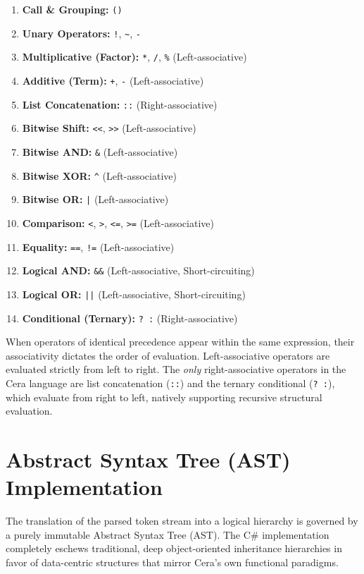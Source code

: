 \documentclass[11pt, a4paper]{article}
\begin{document}
\begin{enumerate}
    \item \textbf{Call \& Grouping:} \texttt{()} 
    \item \textbf{Unary Operators:} \texttt{!}, \texttt{\~{}}, \texttt{-}
    \item \textbf{Multiplicative (Factor):} \texttt{*}, \texttt{/}, \texttt{\%} (Left-associative)
    \item \textbf{Additive (Term):} \texttt{+}, \texttt{-} (Left-associative)
    \item \textbf{List Concatenation:} \texttt{::} (Right-associative)
    \item \textbf{Bitwise Shift:} \texttt{<<}, \texttt{>>} (Left-associative)
    \item \textbf{Bitwise AND:} \texttt{\&} (Left-associative)
    \item \textbf{Bitwise XOR:} \texttt{\^{}} (Left-associative)
    \item \textbf{Bitwise OR:} \texttt{|} (Left-associative)
    \item \textbf{Comparison:} \texttt{<}, \texttt{>}, \texttt{<=}, \texttt{>=} (Left-associative)
    \item \textbf{Equality:} \texttt{==}, \texttt{!=} (Left-associative)
    \item \textbf{Logical AND:} \texttt{\&\&} (Left-associative, Short-circuiting)
    \item \textbf{Logical OR:} \texttt{||} (Left-associative, Short-circuiting)
    \item \textbf{Conditional (Ternary):} \texttt{? :} (Right-associative)
\end{enumerate}

\noindent
When operators of identical precedence appear within the same expression, their associativity dictates the order of evaluation. Left-associative operators are evaluated strictly from left to right. The \textit{only} right-associative operators in the Cera language are list concatenation (\texttt{::}) and the ternary conditional (\texttt{? :}), which evaluate from right to left, natively supporting recursive structural evaluation.

\section{Abstract Syntax Tree (AST) Implementation}
\noindent
The translation of the parsed token stream into a logical hierarchy is governed by a purely immutable Abstract Syntax Tree (AST). The C\# implementation completely eschews traditional, deep object-oriented inheritance hierarchies in favor of data-centric structures that mirror Cera's own functional paradigms.
\end{document}
